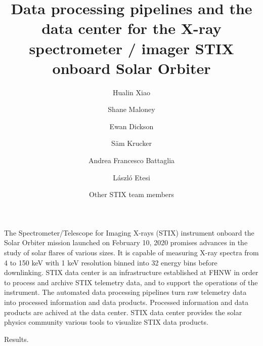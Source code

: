 \documentclass{aa}
\begin{document}
 


   \title{Data processing pipelines and the data center for the X-ray spectrometer / imager STIX onboard Solar Orbiter}

   \subtitle{}

   \author{Hualin Xiao
          \and 
          Shane Maloney 
          \and 
          Ewan Dickson 
          \and 
          S\"am Krucker
          \and Andrea Francesco Battaglia
            \and László Etesi 
          \and Other STIX team members
         }


   \date{}

 
  \abstract
   {} %
   { The Spectrometer/Telescope for Imaging X-rays (STIX) instrument onboard the Solar Orbiter mission launched on February 10, 2020 promises advances in the study of solar flares of various sizes. It is capable of measuring X-ray spectra from 4 to 150 keV with 1 keV resolution binned into 32 energy bins before downlinking. STIX data center is an infrastructure established at FHNW in order to process and archive STIX telemetry data, and to support the operations of the instrument. The automated data processing pipelines turn raw telemetry data into processed information and data products. Processed information and data products are achived at the data center.  STIX data center provides the solar physics community various tools to visualize STIX data products.
   }

   {Results.}
   {}

\end{document}
